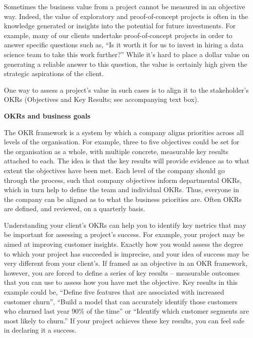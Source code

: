\documentclass[
]{book}
\begin{document}
Sometimes the business value from a project cannot be measured in an objective way. Indeed, the value of exploratory and proof-of-concept projects is often in the knowledge generated or insights into the potential for future investments. For example, many of our clients undertake proof-of-concept projects in order to answer specific questions such as, ``Is it worth it for us to invest in hiring a data science team to take this work further?'' While it's hard to place a dollar value on generating a reliable answer to this question, the value is certainly high given the strategic aspirations of the client.

One way to assess a project's value in such cases is to align it to the stakeholder's OKRs (Objectives and Key Results; see accompanying text box).

\begin{infobox}

\textbf{OKRs and business goals}

The OKR framework is a system by which a company aligns priorities across all levels of the organisation. For example, three to five objectives could be set for the organisation as a whole, with multiple concrete, measurable key results attached to each. The idea is that the key results will provide evidence as to what extent the objectives have been met. Each level of the company should go through the process, such that company objectives inform departmental OKRs, which in turn help to define the team and individual OKRs. Thus, everyone in the company can be aligned as to what the business priorities are. Often OKRs are defined, and reviewed, on a quarterly basis.

\end{infobox}

Understanding your client's OKRs can help you to identify key metrics that may be important for assessing a project's success. For example, your project may be aimed at improving customer insights. Exactly how you would assess the degree to which your project has succeeded is imprecise, and your idea of success may be very different from your client's. If framed as an objective in an OKR framework, however, you are forced to define a series of key results -- measurable outcomes that you can use to assess how you have met the objective. Key results in this example could be, ``Define five features that are associated with increased customer churn'', ``Build a model that can accurately identify those customers who churned last year 90\% of the time'' or ``Identify which customer segments are most likely to churn.'' If your project achieves these key results, you can feel safe in declaring it a success.
\end{document}
